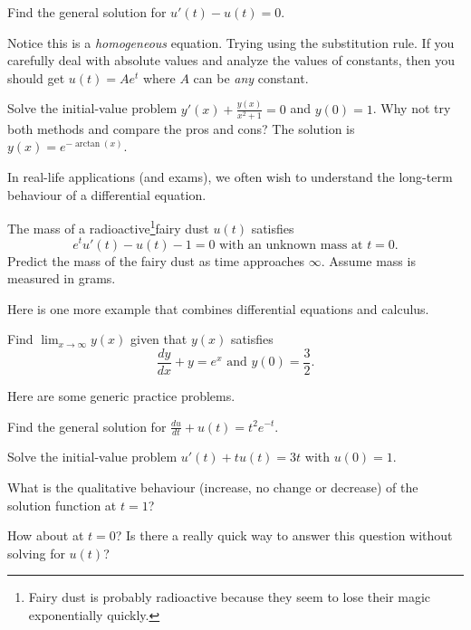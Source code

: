 \documentclass[../main.tex]{subfiles}
\begin{document}
\begin{example}
  Find the general solution for \(u'(t) - u(t) = 0\).

  Notice this is a \emph{homogeneous} equation. Trying using the substitution rule. If you carefully deal with absolute values and analyze the values of constants, then you should get \(u(t) = A e^{t}\) where \(A\) can be \emph{any} constant.

\end{example}

\begin{example}
  Solve the initial-value problem \(y'(x) + \frac{y(x)}{x^{2} + 1} = 0\) and \(y(0) = 1\).  Why not try both methods and compare the pros and cons? The solution is \(y(x) = e^{-\arctan(x)}\).

\end{example}
\clearpage

In real-life applications (and exams), we often wish to understand the long-term behaviour of a differential equation.
\begin{example}
  The mass of a radioactive\footnote{Fairy dust is probably radioactive because they seem to lose their magic exponentially quickly.}fairy dust \(u(t)\) satisfies 
  \[
    e^{t}u'(t) - u(t) - 1 = 0 \text{ with an unknown mass at \(t = 0\)}.
  \]
  Predict the mass of the fairy dust as time approaches \(\infty\). Assume mass is measured in grams.
  
\end{example}

Here is one more example that combines differential equations and calculus. 
\begin{example}
  Find \(\lim_{x \to \infty} y(x)\) given that \(y(x)\) satisfies
  \[
    \frac{dy}{dx} + y = e^{x} \text{ and \(y(0) = \frac{3}{2}\)}.
  \]
\end{example}
\clearpage

Here are some generic practice problems.
\begin{example}
  Find the general solution for \(\frac{du}{dt} + u(t) = t^{2}e^{-t}\).
\end{example}
\clearpage

\begin{example}
  Solve the initial-value problem \(u'(t) + tu(t) = 3t\) with \(u(0) = 1\).  

  What is the qualitative behaviour (increase, no change or decrease) of the solution function at \(t = 1\)?  

  How about at \(t = 0\)? Is there a really quick way to answer this question without solving for \(u(t)\)?
\end{example}
\clearpage
\end{document}
